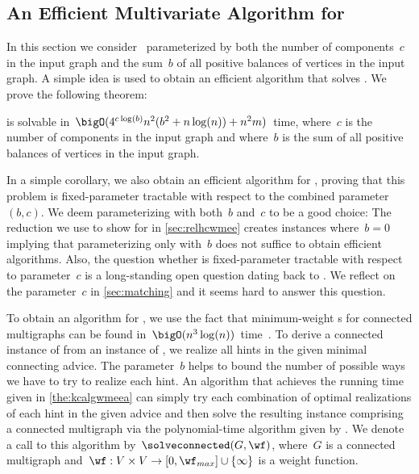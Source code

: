 \subsection{An Efficient Multivariate Algorithm for \pWMEECAs{}}\label{sec:multivariatealg}
In this section we consider~\pWMEECAs{} parameterized by both the number of components~$c$ in the input graph and the sum~$b$ of all positive balances of vertices in the input graph. A simple idea is used to obtain an efficient algorithm that solves \pWMEECAs{}. We prove the following theorem:

\begin{theorem}\label{the:kcalgwmeea}
  \pWMEECA{} is solvable in~$\bigO(4^{c\log(b)}n^2(b^2+ n\log(n)) + n^2m)$~time, where~$c$ is the number of components in the input graph and where~$b$ is the sum of all positive balances of vertices in the input graph.
\end{theorem}

In a simple corollary, we also obtain an efficient algorithm for \pWMEEs{}, proving that this problem is fixed-parameter tractable with respect to the combined parameter~$(b, c)$. We deem parameterizing with both~$b$ and~$c$ to be a good choice: The reduction we use to show \NPhs{} for \pWMEEs{} in \autoref{sec:relhcwmee} creates instances where~$b = 0$ implying that parameterizing only with~$b$ does not suffice to obtain efficient algorithms. Also, the question whether \pWMEEs{} is fixed-parameter tractable with respect to parameter~$c$ is a long-standing open question dating back to \citet{Fre77}. We reflect on the parameter~$c$ in \autoref{sec:matching} and it seems hard to answer this question. 
 


To obtain an algorithm for \pWMEECAs{}, we use the fact that minimum-weight \EE s for connected multigraphs can be found in~$\bigO(n^3\log(n))$~time~\cite{DMNW10}. To derive a connected instance of \pWMEEs{} from an instance of \pWMEECAs{}, we realize all hints in the given minimal connecting advice. The parameter~$b$ helps to bound the number of possible ways we have to try to realize each hint. An algorithm that achieves the running time given in \autoref{the:kcalgwmeea} can simply try each combination of optimal realizations of each hint in the given advice and then solve the resulting instance comprising a connected multigraph via the polynomial-time algorithm given by \citet{DMNW10}. We denote a call to this algorithm by~$\solveconnected(G,\wf)$, where~$G$ is a connected multigraph and~$\wf: V \times V \rightarrow  [0, \wf_{max}]\cup \{\infty\}$ is a weight function. 

